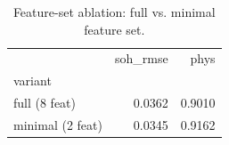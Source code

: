 \begin{table}
\caption{Feature-set ablation: full vs. minimal feature set.}
\label{tab:ablation_aggregation}
\begin{tabular}{lrr}
\toprule
 & soh\_rmse & phys \\
variant &  &  \\
\midrule
full (8 feat) & 0.0362 & 0.9010 \\
minimal (2 feat) & 0.0345 & 0.9162 \\
\bottomrule
\end{tabular}
\end{table}
